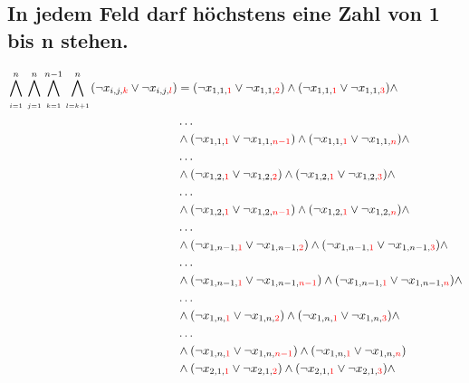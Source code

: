 \documentclass[11pt, a4paper]{article}
\begin{document}
	\subsection{In jedem Feld darf höchstens eine Zahl von 1 bis n stehen.}
	\begin{align*}
		\bigwedge_{\atop i=1}^n \bigwedge_{\atop j=1}^n \bigwedge_{\atop k=1}^{n-1} \bigwedge_{\atop l=k+1}^n
		(\neg x_{i,j,{\color{red}k}} \vee \neg x_{i,j,{\color{red}l}}) &= 
		(\neg x_{1,1,{\color{red} 1}} \vee \neg x_{1,1,{\color{red} 2}}) \wedge (\neg x_{1,1,{\color{red} 1}} \vee \neg x_{1,1,{\color{red} 3}}) \wedge 
		\\ & \dots \\
		& \wedge (\neg x_{1,1,{\color{red} 1}} \vee \neg x_{1,1,{\color{red} n-1}}) \wedge
		(\neg x_{1,1,{\color{red} 1}} \vee \neg x_{1,1,{\color{red} n}}) \wedge 
		\\ & \dots \\
		& \wedge (\neg x_{1,2,{\color{red} 1}} \vee \neg x_{1,2,{\color{red} 2}}) \wedge (\neg x_{1,2,{\color{red} 1}} \vee \neg x_{1,2,{\color{red} 3}}) \wedge 
		\\ & \dots \\
		& \wedge (\neg x_{1,2,{\color{red} 1}} \vee \neg x_{1,2,{\color{red} n-1}}) \wedge (\neg x_{1,2,{\color{red} 1}} \vee \neg x_{1,2,{\color{red} n}}) \wedge
		\\ & \dots \\
		& \wedge (\neg x_{1,n-1,{\color{red} 1}} \vee \neg x_{1,n-1,{\color{red} 2}}) \wedge (\neg x_{1,n-1,{\color{red} 1}} \vee \neg x_{1,n-1,{\color{red} 3}}) \wedge 
		\\ & \dots \\
		& \wedge (\neg x_{1,n-1,{\color{red} 1}} \vee \neg x_{1,n-1,{\color{red} n-1}}) \wedge (\neg x_{1,n-1,{\color{red} 1}} \vee \neg x_{1,n-1,{\color{red} n}}) \wedge
		\\ & \dots \\
		& \wedge (\neg x_{1,n,{\color{red} 1}} \vee \neg x_{1,n,{\color{red} 2}}) 
		\wedge (\neg x_{1,n,{\color{red} 1}} \vee \neg x_{1,n,{\color{red} 3}}) \wedge 
		\\ & \dots \\
		& \wedge (\neg x_{1,n,{\color{red} 1}} \vee \neg x_{1,n,{\color{red} n-1}}) \wedge (\neg x_{1,n,{\color{red} 1}} \vee \neg x_{1,n,{\color{red} n}}) \\
		& \wedge (\neg x_{2,1,{\color{red} 1}} \vee \neg x_{2,1,{\color{red} 2}}) \wedge (\neg x_{2,1,{\color{red} 1}} \vee \neg x_{2,1,{\color{red} 3}}) \wedge 

\end{align*}
\end{document}
